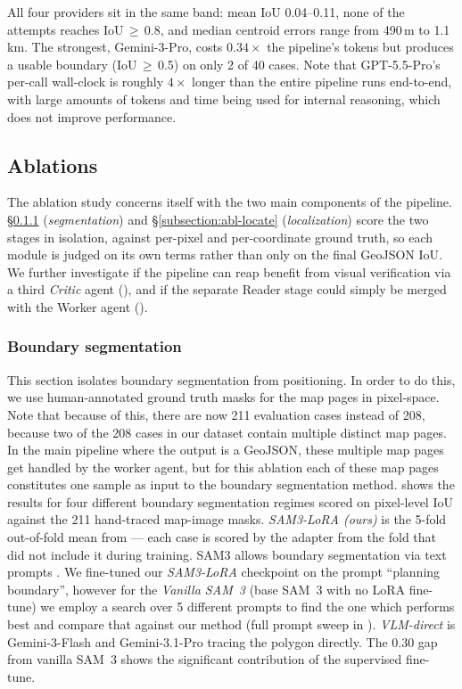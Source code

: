 \documentclass[11pt]{article}
\begin{document}
All four providers sit in the same band: mean IoU 0.04--0.11, none of the attempts reaches IoU\,$\geq$\,0.8, and median centroid errors range from 490\,m to 1.1\,km. The strongest, Gemini-3-Pro, costs $0.34\times$ the pipeline's tokens but produces a usable boundary (IoU\,$\geq$\,0.5) on only 2 of 40 cases. Note that GPT-5.5-Pro's per-call wall-clock is roughly $4\times$ longer than the entire pipeline runs end-to-end, with large amounts of tokens and time being used for internal reasoning, which does not improve performance.

\subsection{Ablations}
\label{section:ablations}

The ablation study concerns itself with the two main components of the pipeline. \S\ref{subsection:abl-finetune} (\emph{segmentation}) and \S\ref{subsection:abl-locate} (\emph{localization}) score the two stages in isolation, against per-pixel and per-coordinate ground truth, so each module is judged on its own terms rather than only on the final GeoJSON IoU. We further investigate if the pipeline can reap benefit from visual verification via a third \emph{Critic} agent (), and if the separate Reader stage could simply be merged with the Worker agent ().

\subsubsection{Boundary segmentation}
\label{subsection:abl-finetune}

This section isolates boundary segmentation from positioning. In order to do this, we use human-annotated ground truth masks for the map pages in pixel-space. Note that because of this, there are now 211 evaluation cases instead of 208, because two of the 208 cases in our dataset contain multiple distinct map pages. In the main pipeline where the output is a GeoJSON, these multiple map pages get handled by the worker agent, but for this ablation each of these map pages constitutes one sample as input to the boundary segmentation method.  shows the results for four different boundary segmentation regimes scored on pixel-level IoU against the 211 hand-traced map-image masks. \emph{SAM3-LoRA (ours)} is the 5-fold out-of-fold mean from  --- each case is scored by the adapter from the fold that did not include it during training. SAM3 allows boundary segmentation via text prompts \cite{carion2025sam3segmentconcepts}. We fine-tuned our \emph{SAM3-LoRA} checkpoint on the prompt ``planning boundary'', however for the \emph{Vanilla SAM~3} (base SAM~3 with no LoRA fine-tune) we employ a search over 5 different prompts to find the one which performs best and compare that against our method (full prompt sweep in ). \emph{VLM-direct} is Gemini-3-Flash and Gemini-3.1-Pro tracing the polygon directly. The 0.30 gap from vanilla SAM~3 shows the significant contribution of the supervised fine-tune.
\end{document}
